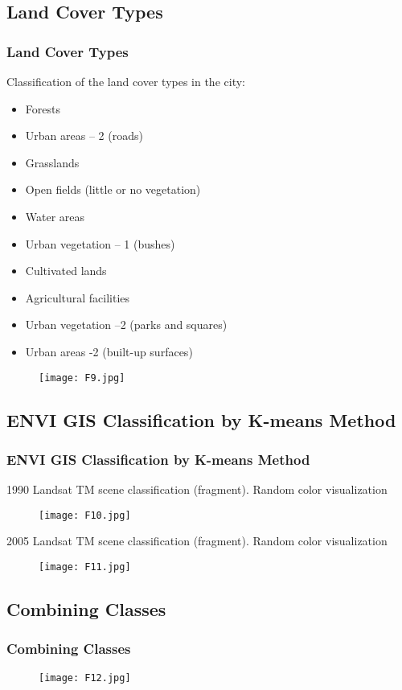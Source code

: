 \documentclass[pdflatex,compress,8pt,
	xcolor={dvipsnames,dvipsnames,svgnames,x11names,table},
	hyperref={colorlinks = true,breaklinks = true, urlcolor = NavyBlue, breaklinks = true}]{beamer}
\begin{document}
\subsection{Land Cover Types}
\begin{frame}\frametitle{Land Cover Types}
Classification of the land cover types in the city:
\begin{itemize}
	\item Forests
	\item Urban areas – 2 (roads)
	\item Grasslands
	\item Open fields (little or no vegetation)
	\item Water areas
	\item Urban vegetation – 1 (bushes)
	\item Cultivated lands
	\item Agricultural facilities
	\item Urban vegetation –2 (parks and squares)
	\item Urban areas -2 (built-up surfaces)
\end{itemize}

\begin{figure}[H]
	\centering
		\texttt{[image: F9.jpg]}
\end{figure}
\end{frame}


\subsection{ENVI GIS Classification by K-means Method}
\begin{frame}\frametitle{ENVI GIS Classification by K-means Method}
\small{1990 Landsat TM scene classification (fragment). Random color visualization}
\begin{figure}[H]
	\centering
		\texttt{[image: F10.jpg]}
\end{figure}
\small{2005 Landsat TM scene classification (fragment). Random color visualization}
\begin{figure}[H]
	\centering
		\texttt{[image: F11.jpg]}
\end{figure}
\end{frame}

\subsection{Combining Classes}
\begin{frame}\frametitle{Combining Classes}
\begin{figure}[H]
	\centering
		\texttt{[image: F12.jpg]}
\end{figure}
\end{frame}
\end{document}
